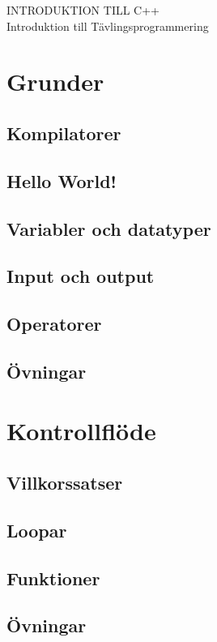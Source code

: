 \documentclass[10pt,a4paper]{article}
\begin{document}
\Large{INTRODUKTION TILL C++}
\\
\small{Introduktion till Tävlingsprogrammering}


\section{Grunder}
	
\subsection{Kompilatorer}

\subsection{Hello World!}

\subsection{Variabler och datatyper}

\subsection{Input och output}

\subsection{Operatorer}

\subsection{Övningar}


\section{Kontrollflöde}
\subsection{Villkorssatser}

\subsection{Loopar}

\subsection{Funktioner}

\subsection{Övningar}

\end{document}
